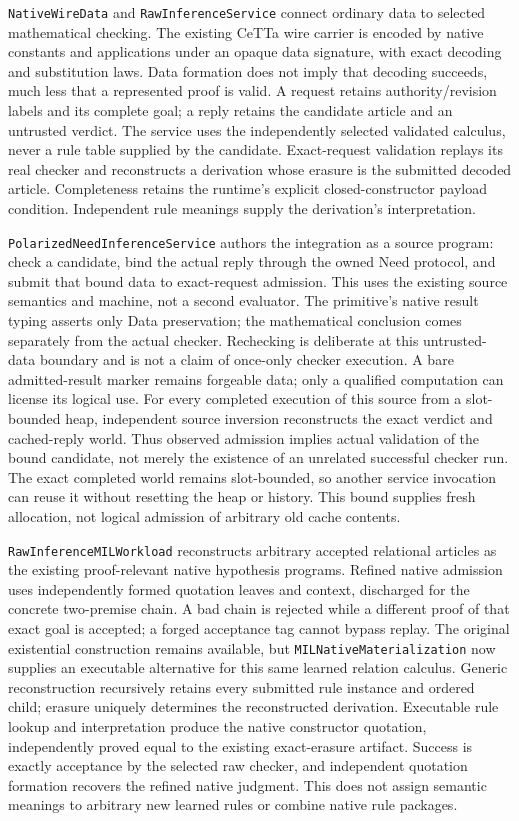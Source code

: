 \documentclass[11pt]{article}
\theoremstyle{definition}
\theoremstyle{remark}
\begin{document}
\nolinkurl{NativeWireData} and \nolinkurl{RawInferenceService} connect
ordinary data to selected mathematical checking. The existing CeTTa wire
carrier is encoded by native constants and applications under an opaque
data signature, with exact decoding and substitution laws. Data formation
does not imply that decoding succeeds, much less that a represented proof
is valid. A request retains authority/revision labels and its complete goal;
a reply retains the candidate article and an untrusted verdict. The service
uses the independently selected validated calculus, never a rule table
supplied by the candidate. Exact-request validation replays its real checker
and reconstructs a derivation whose erasure is the submitted decoded article.
Completeness retains the runtime's explicit closed-constructor payload
condition. Independent rule meanings supply the derivation's interpretation.

\nolinkurl{PolarizedNeedInferenceService} authors the integration as a source
program: check a candidate, bind the actual reply through the owned Need
protocol, and submit that bound data to exact-request admission. This uses
the existing source semantics and machine, not a second evaluator. The
primitive's native result typing asserts only Data preservation; the
mathematical conclusion comes separately from the actual checker. Rechecking
is deliberate at this untrusted-data boundary and is not a claim of
once-only checker execution. A bare admitted-result marker remains forgeable
data; only a qualified computation can license its logical use.
For every completed execution of this source from a slot-bounded heap,
independent source inversion reconstructs the exact verdict and cached-reply world.
Thus observed admission implies actual validation of the bound candidate,
not merely the existence of an unrelated successful checker run.
The exact completed world remains slot-bounded, so another service invocation
can reuse it without resetting the heap or history. This bound supplies
fresh allocation, not logical admission of arbitrary old cache contents.

\nolinkurl{RawInferenceMILWorkload} reconstructs arbitrary accepted
relational articles as the existing proof-relevant native hypothesis
programs. Refined native admission uses independently formed quotation
leaves and context, discharged for the concrete two-premise chain. A bad
chain is rejected while a different proof of that exact goal is accepted;
a forged acceptance tag cannot bypass replay. The original existential
construction remains available, but
\nolinkurl{MILNativeMaterialization} now supplies an executable alternative
for this same learned relation calculus. Generic reconstruction recursively
retains every submitted rule instance and ordered child; erasure uniquely
determines the reconstructed derivation. Executable rule lookup and
interpretation produce the native constructor quotation, independently
proved equal to the existing exact-erasure artifact. Success is exactly
acceptance by the selected raw checker, and independent quotation formation
recovers the refined native judgment. This does not assign semantic meanings
to arbitrary new learned rules or combine native rule packages.
\end{document}
